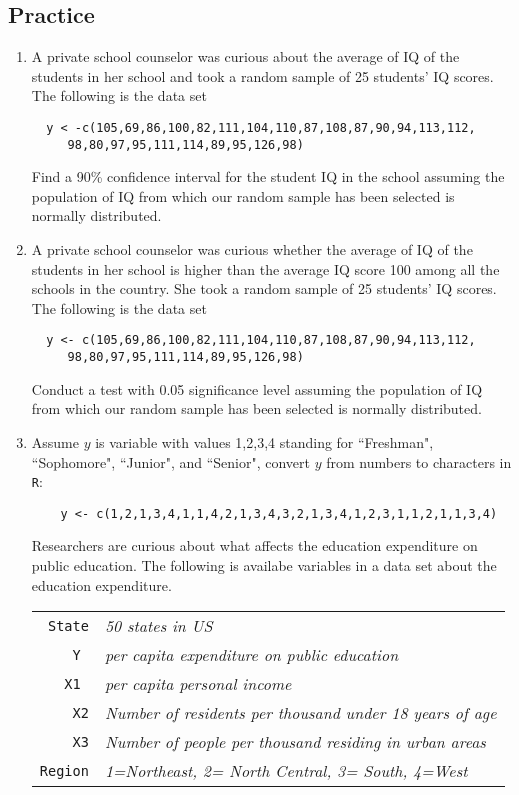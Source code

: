 \documentclass{article}\usepackage[]{graphicx}\usepackage[]{color}
\newcommand{\hlstd}[1]{\textcolor[rgb]{0.345,0.345,0.345}{#1}}%
\renewcommand{\hlstd}[1]{\textcolor[rgb]{0.387,0.581,0.148}{\texttt{#1}}}%
\begin{document}
\subsection*{Practice}
\begin{enumerate}

\item
A private school counselor was curious about the average of IQ of the students in her school and took a random sample of 25 students' IQ scores. The following is the data set
\begin{verbatim}
  y < -c(105,69,86,100,82,111,104,110,87,108,87,90,94,113,112, 
     98,80,97,95,111,114,89,95,126,98)
    \end{verbatim}
Find a 90\% confidence interval for the student IQ in the school assuming the population of IQ from which our random sample has been selected is normally distributed. 


\item
A private school counselor was curious  whether  the average of IQ of the students in her school is higher than the average IQ score 100 among all the schools in the country. She took a random sample of 25 students' IQ scores. The following is the data set
\begin{verbatim}
  y <- c(105,69,86,100,82,111,104,110,87,108,87,90,94,113,112, 
     98,80,97,95,111,114,89,95,126,98)
    \end{verbatim}
Conduct a test with 0.05 significance level assuming the population of IQ from which our random sample has been selected is normally distributed. 

\item
Assume $y$ is variable with values 1,2,3,4 standing for ``Freshman", ``Sophomore", ``Junior", and ``Senior", convert $y$ from numbers to characters in \texttt{R}:
\begin{verbatim}
    y <- c(1,2,1,3,4,1,1,4,2,1,3,4,3,2,1,3,4,1,2,3,1,1,2,1,1,3,4)
\end{verbatim}

Researchers are curious about what affects the education expenditure on public education. The following is availabe variables in a data set about the education expenditure. 

\begin{tabular}{r|l}
\hlstd{State} &\emph{50 states in US} \\
\hlstd{Y } & \emph{per capita expenditure on public education}\\
\hlstd{X1 } &\emph{per capita personal income} \\
\hlstd{X2} &  \emph{Number of residents per thousand under 18 years of age}\\
\hlstd{X3} &  \emph{Number of people per thousand residing in urban areas} \\
\hlstd{Region} &  \emph{1=Northeast, 2= North Central, 3= South, 4=West} \\
\end{tabular}


\end{enumerate}
\end{document}
